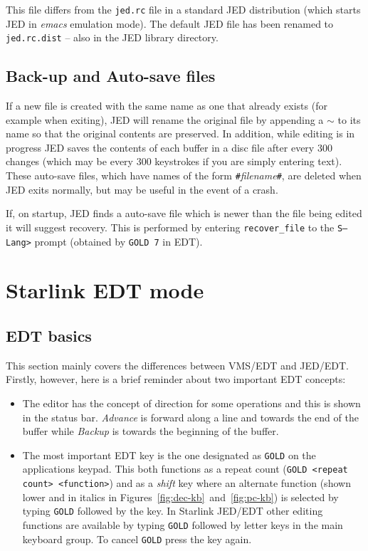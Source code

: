\documentclass[twoside,11pt]{starlink}
\begin{document}
This file differs from the \texttt{jed.rc} file in a standard JED
distribution (which starts JED in \textit{emacs} emulation mode). The
default JED file has been renamed to \texttt{jed.rc.dist}  -- also in
the JED library directory.

\subsection{Back-up and Auto-save files}
\label{backup_and_auto-save_files}

If a new file is created with the same name as one that already exists
(for example when exiting), JED will rename the original file by
appending a $\sim$ to its name so that the original contents are
preserved. In addition, while editing is in progress JED saves the
contents of each buffer in a disc file after every 300 changes (which may
be every 300 keystrokes if you are simply entering text). These auto-save
files, which have names of the form \texttt{\#}\emph{filename}\texttt{\#}, are deleted when JED exits
normally, but may be useful in the event of a crash.

If, on startup, JED finds a auto-save file which is newer than the file being
edited it will suggest recovery. This is performed by entering
\texttt{recover\_file} to the \texttt{S--Lang>} prompt (obtained by
\texttt{GOLD 7} in EDT).

\section{Starlink EDT mode}
\label{starlink_edt_mode}

\subsection{EDT basics}
\label{edt_basics}

This section mainly covers the  differences between VMS/EDT and
JED/EDT\@. Firstly, however, here is a brief reminder about two important EDT
concepts:
\begin{itemize}
\item The editor has the concept of direction for some operations and
this is shown in the status bar. \textit{Advance} is forward along a
line and towards the end of the buffer while \textit{Backup} is towards the
beginning of the buffer.

\item The most important EDT key is the one designated as \texttt{GOLD} on
the applications keypad. This both functions as a repeat count
(\texttt{GOLD <repeat count> <function>}) and as a
\textit{shift} key where an alternate function (shown lower and in italics in
Figures~{\ref{fig:dec-kb}}~and~\ref{fig:pc-kb}) is selected by typing
\texttt{GOLD} followed by the key. In Starlink JED/EDT other editing
functions are available by typing \texttt{GOLD} followed by letter keys in
the main keyboard group. To cancel \texttt{GOLD} press the key again.

\end{itemize}
\end{document}
